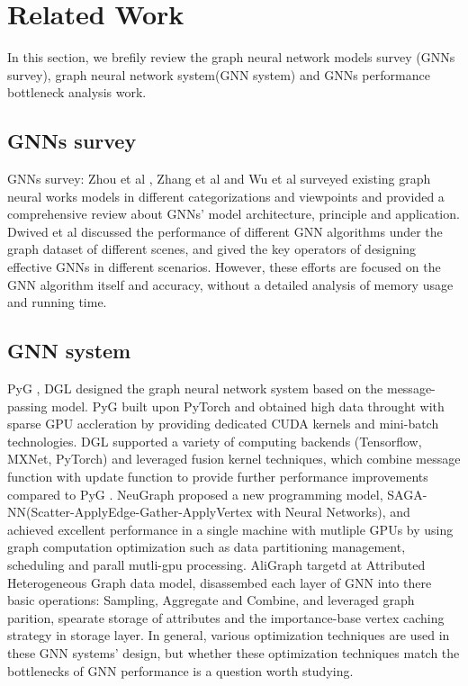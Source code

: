\section{Related Work}

In this section, we brefily review the graph neural network models survey (GNNs survey), 
graph neural network system(GNN system) and GNNs performance bottleneck analysis work.

\subsection{GNNs survey}
GNNs survey: Zhou et al \cite{zhou2018_gnn_review}, Zhang et al \cite{zhou2018_gnn_review} and Wu et al \cite{comprehensive-survey-wu-2020} 
surveyed existing graph neural works models in different categorizations and viewpoints and provided a comprehensive review about GNNs' model 
architecture, principle and application. Dwived et al \cite{dwivedi2020_benchmark_of_gnn} discussed the performance of different GNN algorithms 
under the graph dataset of different scenes, and gived the key operators of designing effective GNNs in different scenarios. 
However, these efforts are focused on the GNN algorithm itself and accuracy, without a detailed analysis of memory usage and running time.

\subsection{GNN system}
PyG \cite{PyG}, DGL \cite{DGL} designed the graph neural network system based on the message-passing model. 
PyG \cite{PyG} built upon PyTorch and obtained high data throught with sparse GPU accleration by providing dedicated CUDA kernels 
and mini-batch technologies. DGL \cite{DGL} supported a variety of computing backends (Tensorflow, MXNet, PyTorch) and leveraged
fusion kernel techniques, which combine message function with update function to provide further performance improvements compared to PyG \cite{PyG}. 
NeuGraph \cite{ma2019_neugraph} proposed a new programming model, SAGA-NN(Scatter-ApplyEdge-Gather-ApplyVertex with Neural Networks), and achieved excellent
performance in a single machine with mutliple GPUs by using graph computation optimization such as data partitioning management, scheduling and parall mutli-gpu processing.
AliGraph \cite{zhu2019_aligraph} targetd at Attributed Heterogeneous Graph data model, disassembed each layer of GNN into there basic operations: Sampling, Aggregate and Combine,
and leveraged graph parition, spearate storage of attributes and the importance-base vertex caching strategy in storage layer. 
In general, various optimization techniques are used in these GNN systems' design, but whether these optimization techniques match the bottlenecks of GNN performance is a question
worth studying.

